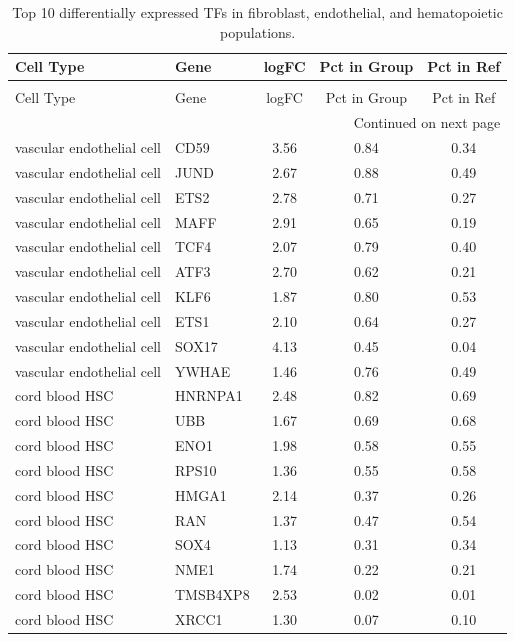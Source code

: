 \begin{longtable}{llccc}
\caption{Top 10 differentially expressed TFs in fibroblast, endothelial, and hematopoietic populations.} \label{tab:degs_fibro_endothelial_hematopoietic_TF} \\
\toprule
Cell Type & Gene & logFC & Pct in Group & Pct in Ref \\
\midrule
\endfirsthead
\caption[]{Top 10 differentially expressed TFs in fibroblast, endothelial, and hematopoietic populations.} \\
\toprule
Cell Type & Gene & logFC & Pct in Group & Pct in Ref \\
\midrule
\endhead
\midrule
\multicolumn{5}{r}{Continued on next page} \\
\midrule
\endfoot
\bottomrule
\endlastfoot
vascular endothelial cell & CD59 & 3.56 & 0.84 & 0.34 \\
vascular endothelial cell & JUND & 2.67 & 0.88 & 0.49 \\
vascular endothelial cell & ETS2 & 2.78 & 0.71 & 0.27 \\
vascular endothelial cell & MAFF & 2.91 & 0.65 & 0.19 \\
vascular endothelial cell & TCF4 & 2.07 & 0.79 & 0.40 \\
vascular endothelial cell & ATF3 & 2.70 & 0.62 & 0.21 \\
vascular endothelial cell & KLF6 & 1.87 & 0.80 & 0.53 \\
vascular endothelial cell & ETS1 & 2.10 & 0.64 & 0.27 \\
vascular endothelial cell & SOX17 & 4.13 & 0.45 & 0.04 \\
vascular endothelial cell & YWHAE & 1.46 & 0.76 & 0.49 \\
cord blood HSC & HNRNPA1 & 2.48 & 0.82 & 0.69 \\
cord blood HSC & UBB & 1.67 & 0.69 & 0.68 \\
cord blood HSC & ENO1 & 1.98 & 0.58 & 0.55 \\
cord blood HSC & RPS10 & 1.36 & 0.55 & 0.58 \\
cord blood HSC & HMGA1 & 2.14 & 0.37 & 0.26 \\
cord blood HSC & RAN & 1.37 & 0.47 & 0.54 \\
cord blood HSC & SOX4 & 1.13 & 0.31 & 0.34 \\
cord blood HSC & NME1 & 1.74 & 0.22 & 0.21 \\
cord blood HSC & TMSB4XP8 & 2.53 & 0.02 & 0.01 \\
cord blood HSC & XRCC1 & 1.30 & 0.07 & 0.10 \\

\end{longtable}

